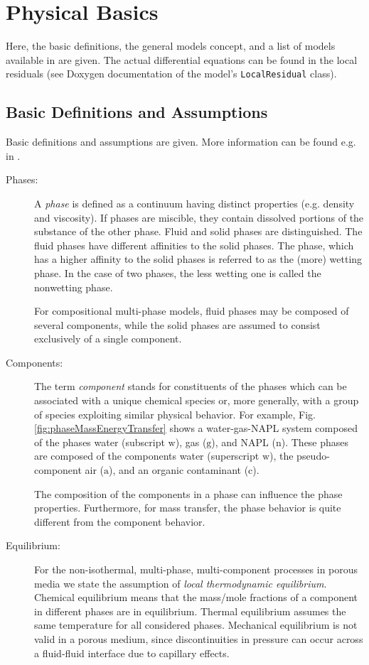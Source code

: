 \section{Physical Basics}
Here, the basic definitions, the general models concept, and a list of
models available in \Dumux are given. The actual differential equations
can be found in the local residuals (see Doxygen documentation of the
model's \texttt{LocalResidual} class).

\subsection{Basic Definitions and Assumptions}
Basic definitions and assumptions are given. More information can be found e.g. in \cite{A3:acosta:2006,A3:bielinski:2006}.

\begin{description}
\item[Phases:]
A \emph{phase} is defined as a continuum having distinct properties (e.g. density and viscosity). If phases are miscible, they contain dissolved portions of the substance of the other phase. 
Fluid and solid phases are distinguished. The fluid phases have different affinities to the solid phases. The phase, which has a higher affinity to the solid phases is referred to as the (more) wetting phase. In the case of two phases, the less wetting one is called the nonwetting phase. 

For compositional multi-phase models, fluid phases may be composed of several components, while the solid phases are assumed to consist exclusively of a single component. 

\item[Components:]
The term \emph{component} stands for constituents of the phases which
can be associated with a unique chemical species or, more generally, with
a group of species exploiting similar physical behavior. For example, Fig. \ref{fig:phaseMassEnergyTransfer} shows a water-gas-NAPL system composed of the phases water (subscript
$\text{w}$), gas ($\text{g}$), and NAPL ($\text{n}$). These phases are
composed of the components water (superscript $\text{w}$), the pseudo-component
air ($\text{a}$), and an organic contaminant ($\text{c}$).

The composition of the components in a phase can influence the phase properties. Furthermore, for mass transfer, the phase behavior is quite different from the component behavior.

\item[Equilibrium:]
For the non-isothermal, multi-phase, multi-component processes in porous media
we state the assumption of \emph{local thermodynamic equilibrium}.
Chemical equilibrium means that the mass/mole fractions of a component in
different phases are in equilibrium.
Thermal equilibrium assumes the same temperature for all considered phases.
Mechanical equilibrium is not valid in a porous medium, since discontinuities
in pressure can occur across a fluid-fluid interface due to capillary effects.


\end{description}
